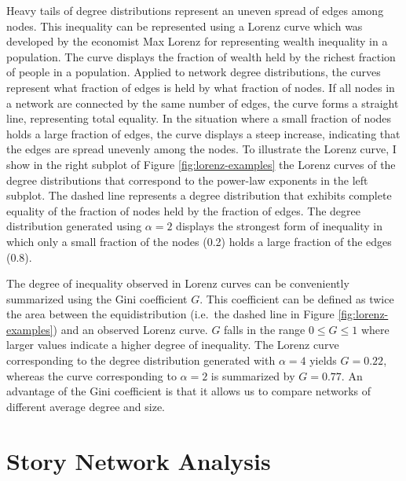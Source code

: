 Heavy tails of degree distributions represent an uneven spread of edges among nodes. This inequality can be represented using a Lorenz curve which was developed by the economist Max Lorenz for representing wealth inequality in a population. The curve displays the fraction of wealth held by the richest fraction of people in a population. Applied to network degree distributions, the curves represent what fraction of edges is held by what fraction of nodes. If all nodes in a network are connected by the same number of edges, the curve forms a straight line, representing total equality. In the situation where a small fraction of nodes holds a large fraction of edges, the curve displays a steep increase, indicating that the edges are spread unevenly among the nodes. To illustrate the Lorenz curve, I show in the right subplot of Figure \ref{fig:lorenz-examples} the Lorenz curves of the degree distributions that correspond to the power-law exponents in the left subplot. The dashed line represents a degree distribution that exhibits complete equality of the fraction of nodes held by the fraction of edges. The degree distribution generated using $\alpha=2$ displays the strongest form of inequality in which only a small fraction of the nodes (0.2) holds a large fraction of the edges (0.8).

The degree of inequality observed in Lorenz curves can be conveniently summarized using the Gini coefficient $G$. This coefficient can be defined as twice the area between the equidistribution (i.e.\ the dashed line in Figure \ref{fig:lorenz-examples}) and an observed Lorenz curve. $G$ falls in the range $0 \leq G \leq 1$ where larger values indicate a higher degree of inequality. The Lorenz curve corresponding to the degree distribution generated with $\alpha=4$ yields $G=0.22$, whereas the curve corresponding to $\alpha=2$ is summarized by $G=0.77$. An advantage of the Gini coefficient is that it allows us to compare networks of different average degree and size\autocite{Badham:2013}. 


\section{Story Network Analysis}\label{sec:network-analysis}

